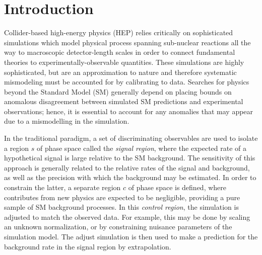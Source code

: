 \documentclass[reprint,nofootinbib,...]{revtex4-1}
\begin{document}


\section{Introduction}
\label{sec:intro}
Collider-based high-energy physics (HEP) relies critically on sophisticated simulations which model physical process spanning sub-nuclear reactions all the way to macroscopic detector-length scales in order to connect fundamental theories to experimentally-observable quantities.
These simulations are highly sophisticated, but are an approximation to nature and therefore systematic mismodeling must be accounted for by calibrating to data.
Searches for physics beyond the Standard Model (SM) generally depend on placing bounds on anomalous disagreement between simulated SM predictions and experimental observations; hence, it is essential to account for any anomalies that may appear due to a mismodelling in the simulation.

In the traditional paradigm, a set of discriminating observables are used to isolate a region $s$ of phase space called the \textit{signal region}, where the expected rate of a hypothetical signal is large relative to the SM background.
The sensitivity of this approach is generally related to the relative rates of the signal and background, as well as the precision with which the background may be estimated.
In order to constrain the latter, a separate region $c$ of phase space is defined, where contributes from new physics are expected to be negligible, providing a pure sample of SM background processes.
In this \textit{control region}, the simulation is adjusted to match the observed data.  For example, this may be done by scaling an unknown normalization, or by constraining nuisance parameters of the simulation model.  The adjust simulation is then used to make a prediction for the background rate in the signal region by extrapolation. 

\end{document}
